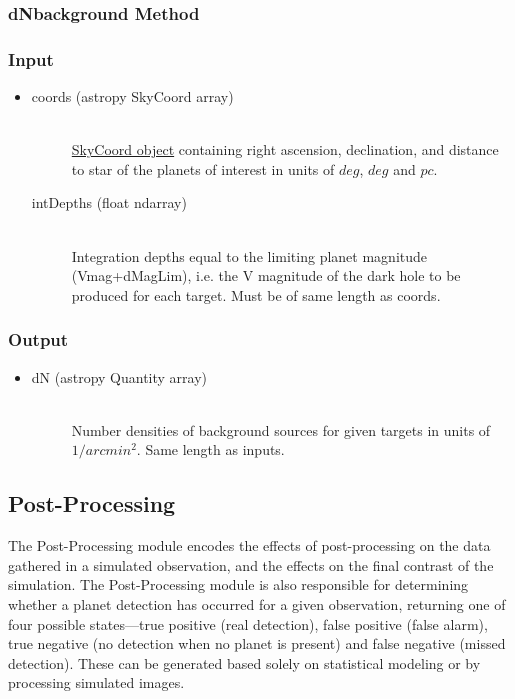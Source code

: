 \documentclass[cleanfoot]{asme2ej}
\begin{document}
\subsubsection{dNbackground Method} \label{sec:dNbackgroundtask}

\subsubsection*{Input}
\begin{itemize}
\item 
\begin{description}
    \item[coords (astropy SkyCoord array)] \hfill \\ \href{http://astropy.readthedocs.org/en/latest/api/astropy.coordinates.SkyCoord.html}{SkyCoord object} containing right ascension, declination, and  distance to star of the planets of interest in units of $ deg $, $ deg $ and $ pc $.
    \item[intDepths (float ndarray)] \hfill \\ Integration depths equal to the limiting planet magnitude (Vmag+dMagLim), i.e. the V magnitude of the dark hole to be produced for each target. Must be of same length as coords.
\end{description}
\end{itemize}

\subsubsection*{Output}
\begin{itemize}
\item 
\begin{description}
    \item[dN (astropy Quantity array)] \hfill \\ Number densities of background sources for given targets in  units of $ 1/arcmin^2 $. Same length as inputs.
\end{description}
\end{itemize}



\subsection{Post-Processing}\label{sec:postprocessing}
The Post-Processing module encodes the effects of post-processing on the data gathered in a simulated observation, and the effects on the final contrast of the simulation.  The Post-Processing module is also responsible for determining whether a planet detection has occurred for a given observation, returning one of four possible states---true positive (real detection), false positive (false alarm), true negative (no detection when no planet is present) and false negative (missed detection).  These can be generated based solely on statistical modeling or by processing simulated images.
\end{document}
